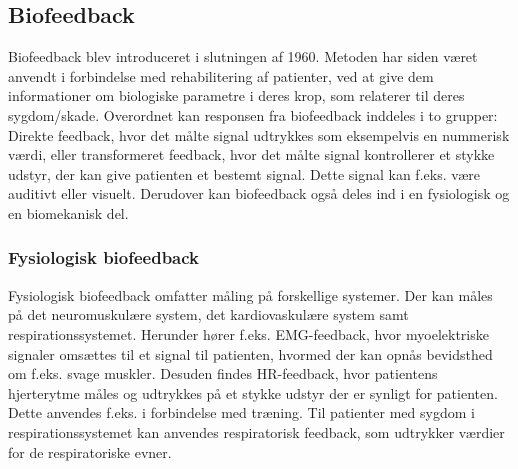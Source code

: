 \subsection{Biofeedback}
Biofeedback blev introduceret i slutningen af 1960. Metoden har siden været anvendt i forbindelse med rehabilitering af patienter, ved at give dem informationer om biologiske parametre i deres krop, som relaterer til deres sygdom/skade. 
Overordnet kan responsen fra biofeedback inddeles i to grupper: Direkte feedback, hvor det målte signal udtrykkes som eksempelvis en nummerisk værdi, eller transformeret feedback, hvor det målte signal kontrollerer et stykke udstyr, der kan give patienten et bestemt signal. Dette signal kan f.eks. være auditivt eller visuelt.
Derudover kan biofeedback også deles ind i en fysiologisk og en biomekanisk del.

\subsubsection{Fysiologisk biofeedback}
Fysiologisk biofeedback omfatter måling på forskellige systemer. Der kan måles på det neuromuskulære system, det kardiovaskulære system samt respirationssystemet. 
Herunder hører f.eks. EMG-feedback, hvor myoelektriske signaler omsættes til et signal til patienten, hvormed der kan opnås bevidsthed om f.eks. svage muskler. Desuden findes HR-feedback, hvor patientens hjerterytme måles og udtrykkes på et stykke udstyr der er synligt for patienten. Dette anvendes f.eks. i forbindelse med træning. Til patienter med sygdom i respirationssystemet kan anvendes respiratorisk feedback, som udtrykker værdier for de respiratoriske evner.

